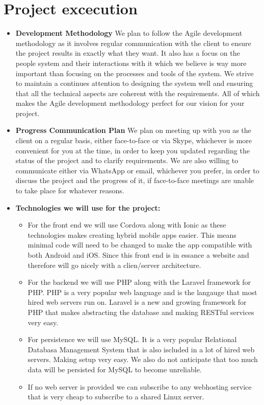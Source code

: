 \documentclass{article}
\begin{document}
	\section{Project excecution}
	\begin{itemize}
		\item \textbf{Development Methodology} \newline \newline
		We plan to follow the Agile development methodology as it involves regular communication with the client to ensure the project results in exactly what they want. It also has a focus on the people system and their interactions with it which we believe is way more important than focusing on the processes and tools of the system. We strive to maintain a continues attention to designing the system well and ensuring that all the technical aspects are coherent with the requirements. All of which makes the Agile development methodology perfect for our vision for your project.
		
		\item \textbf{Progress Communication Plan} \newline \newline
		We plan on meeting up with you as the client on a regular basis, either face-to-face or via Skype, whichever is more convenient for you at the time, in order to keep you updated regarding the status of the project and to clarify requirements. We are also willing to communicate either via WhatsApp or email, whichever you prefer, in order to discuss the project and the progress of it, if face-to-face meetings are unable to take place for whatever reasons.

		\item \textbf{Technologies we will use for the project:}
			\begin{itemize}
				\item For the front end we will use Cordova along with Ionic as these technologies makes creating hybrid mobile apps easier. This means minimal code will need to be changed to make the app compatible with both Android and iOS. Since this front end is in essance a website and therefore will go nicely with a clien/server architecture.
				\item For the backend we will use PHP along with the Laravel framework for PHP. PHP is a very popular web language and is the langauge that most hired web servers run on. Laravel is a new and growing framework for PHP that makes abstracting the database and making RESTful services very easy.
				\item For persistence we will use MySQL. It is a very popular Relational Databasa Management System that is also iscluded in a lot of hired web servers. Making setup very easy. We also do not anticipate that too much data will be persisted for MySQL to become unreliable.
				\item If no web server is provided we can subscribe to any webhosting service that is very cheap to subscribe to a shared Linux server.
			\end{itemize}
	\end{itemize}
\end{document}
